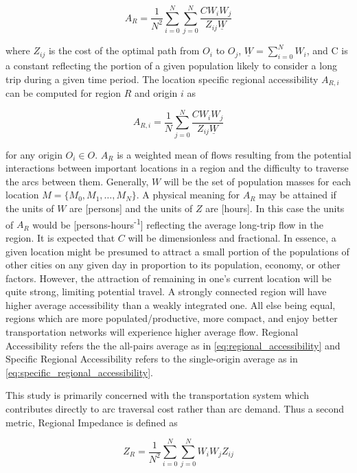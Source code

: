 \begin{equation}
	A_{R} = \frac{1}{N^2}\sum_{i = 0}^{N} \sum_{j = 0 }^{N} \frac{CW_iW_j}{Z_{ij}\underline{W}} \label{eq:regional_accessibility}
\end{equation}

\noindent where $Z_{ij}$ is the cost of the optimal path from $O_i$ to $O_j$, $\underline{W} = \sum_{i = 0}^{N} W_i$, and C is a constant reflecting the portion of a given population likely to consider a long trip during a given time period. The location specific regional accessibility $A_{R,i}$ can be computed for region $R$ and origin $i$ as

\begin{equation}
	A_{R,i} = \frac{1}{N}\sum_{j = 0 }^{N} \frac{CW_iW_j}{Z_{ij}\underline{W}} \label{eq:specific_regional_accessibility}
\end{equation}

for any origin $O_i \in O$. $A_{R}$ is a weighted mean of flows resulting from the potential interactions between important locations in a region and the difficulty to traverse the arcs between them. Generally, $W$ will be the set of population masses for each location $M = \{M_0, M_1, \dots, M_N\}$. A physical meaning for $A_R$ may be attained if the units of $W$ are [persons] and the units of $Z$ are [hours]. In this case the units of $A_R$ would be [persons-hours\textsuperscript{-1}] reflecting the average long-trip flow in the region. It is expected that $C$ will be dimensionless and fractional. In essence, a given location might be presumed to attract a small portion of the populations of other cities on any given day in proportion to its population, economy, or other factors. However, the attraction of remaining in one's current location will be quite strong, limiting potential travel. A strongly connected region will have higher average accessibility than a weakly integrated one. All else being equal, regions which are more populated/productive, more compact, and enjoy better transportation networks will experience higher average flow. Regional Accessibility refers the the all-pairs average as in \eqref{eq:regional_accessibility} and Specific Regional Accessibility refers to the single-origin average as in \eqref{eq:specific_regional_accessibility}.

This study is primarily concerned with the transportation system which contributes directly to arc traversal cost rather than arc demand. Thus a second metric, Regional Impedance is defined as

\begin{equation}
	Z_{R} = \frac{1}{N^2}\sum_{i = 0}^{N} \sum_{j = 0 }^{N} W_iW_jZ_{ij} \label{eq:regional_impedance}
\end{equation}

